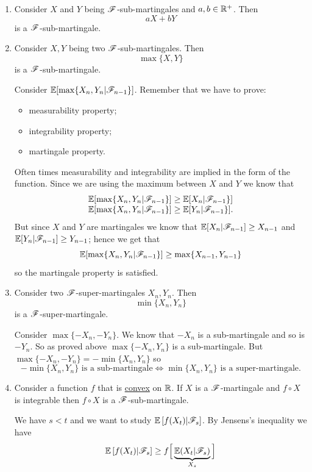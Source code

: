 \documentclass{report}
\begin{document}
\begin{enumerate}
	\item Consider $X$ and $Y$ being $\mathscr{F}$-sub-martingales and $a,b\in\mathbb{R}^{+}$. Then 
	\[aX+bY\]
	is a $\mathscr{F}$-sub-martingale.
	\item Consider $X,Y$ being two $\mathscr{F}$-sub-martingales. Then
	\[\max\{X,Y\}\]
	is a $\mathscr{F}$-sub-martingale.
	\begin{fancyproof}
		Consider $\mathbb{E}[\max\{X_{n},Y_{n}|\mathscr{F}_{n-1}\}]$. Remember that we have to prove: \begin{itemize}
			\item measurability property;
			\item integrability property;
			\item martingale property.
		\end{itemize}
		Often times measurability and integrability are implied in the form of the function.  Since we are using the maximum between $X$ and $Y$ we know that
		\[\begin{array}{l}
			\mathbb{E}[\max\{X_{n},Y_{n}|\mathscr{F}_{n-1}\}]\geq\mathbb{E}[X_{n}|\mathscr{F}_{n-1}\}]\\
			\mathbb{E}[\max\{X_{n},Y_{n}|\mathscr{F}_{n-1}\}]\geq\mathbb{E}[Y_{n}|\mathscr{F}_{n-1}\}].
		\end{array}\]
		But since $X$ and $Y$ are martingales we know that $\mathbb{E}[X_{n}|\mathscr{F}_{n-1}]\geq X_{n-1}$ and $\mathbb{E}[Y_{n}|\mathscr{F}_{n-1}]\geq Y_{n-1}$; hence we get that
		\[\mathbb{E}[\max\{X_{n},Y_{n}|\mathscr{F}_{n-1}\}]\geq\max\{X_{n-1},Y_{n-1}\}\]
		so the martingale property is satisfied.
	\end{fancyproof}
	\item Consider two $\mathscr{F}$-super-martingales $X_{n},Y_{n}$. Then
	\[\min\{X_{n},Y_{n}\}\]
	is a $\mathscr{F}$-super-martingale.
	\begin{fancyproof}
		Consider $\max\{-X_{n},-Y_{n}\}$. We know that $-X_n$ is a sub-martingale and so is $-Y_{n}$. So as proved above $\max\{-X_{n},Y_{n}\}$ is a sub-martingale. But $\max\{-X_{n},-Y_{n}\}=-\min\{X_{n},Y_{n}\}$ so
		\[-\min\{X_{n},Y_{n}\}\text{ is a sub-martingale}\iff\min\{X_{n},Y_{n}\}\text{ is a super-martingale}.\]
	\end{fancyproof}
	\item Consider a function $f$ that is \underline{convex} on $\mathbb{R}$. If $X$ is a $\mathscr{F}$-martingale and $f\circ X$ is integrable then $f\circ X$ is a $\mathscr{F}$-sub-martingale.
	\begin{fancyproof}
		We have $s<t$ and we want to study $\mathbb{E}\left[f(X_{t})|\mathscr{F}_{s}\right]$. By Jensens's inequality we have
		\begin{align*}
			\ev\left[f(X_{t})|\F_{s}\right]&\geq f\Big[\underbrace{\ev(X_{t}|\F_s)}_{X_s}\Big]\\

\end{align*}
\end{fancyproof}
\end{enumerate}
\end{document}
